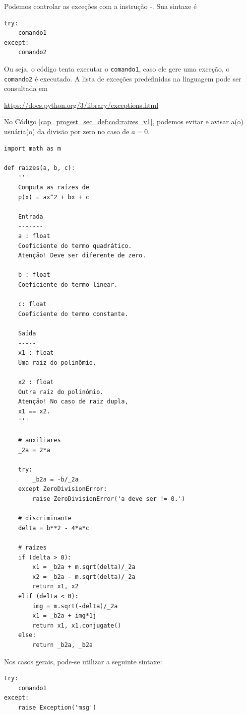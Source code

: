Podemos controlar as exceções com a instrução {\PYTHONtry}-{\PYTHONexcept}. Sua sintaxe é

\begin{lstlisting}
try:
    comando1
except:
    comando2
\end{lstlisting}

Ou seja, o código tenta executar o \lstinline+comando1+, caso ele gere uma exceção, o \lstinline+comando2+ é executado. A lista de exceções predefinidas na linguagem pode ser consultada em
\begin{center}
  \url{https://docs.python.org/3/library/exceptions.html}
\end{center}

\begin{ex}
  No Código \ref{cap_progest_sec_def:cod:raizes_v1}, podemos evitar e avisar a(o) usuária(o) da divisão por zero no caso de $a=0$.

\begin{lstlisting}[caption=raizes\_v2.py]
import math as m

def raizes(a, b, c):
    '''
    Computa as raízes de
    p(x) = ax^2 + bx + c

    Entrada
    -------
    a : float
    Coeficiente do termo quadrático.
    Atenção! Deve ser diferente de zero.

    b : float 
    Coeficiente do termo linear.

    c: float
    Coeficiente do termo constante.

    Saída
    -----
    x1 : float
    Uma raiz do polinômio.

    x2 : float
    Outra raiz do polinômio.
    Atenção! No caso de raiz dupla,
    x1 == x2.
    '''

    # auxiliares
    _2a = 2*a

    try:
        _b2a = -b/_2a
    except ZeroDivisionError:
        raise ZeroDivisionError('a deve ser != 0.')

    # discriminante
    delta = b**2 - 4*a*c

    # raízes
    if (delta > 0):
        x1 = _b2a + m.sqrt(delta)/_2a
        x2 = _b2a - m.sqrt(delta)/_2a
        return x1, x2
    elif (delta < 0):
        img = m.sqrt(-delta)/_2a
        x1 = _b2a + img*1j
        return x1, x1.conjugate()
    else:
        return _b2a, _b2a
\end{lstlisting}

\end{ex}

\begin{obs}
  Nos casos gerais, pode-se utilizar a seguinte sintaxe:

\begin{lstlisting}
try:
    comando1
except:
    raise Exception('msg')
\end{lstlisting}

\end{obs}

